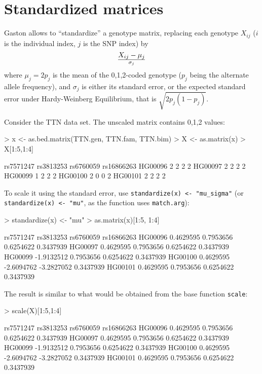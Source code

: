 \documentclass{article}
\renewenvironment{Schunk}{\vspace{\topsep}}{\vspace{\topsep}}
\begin{document}
\section{Standardized matrices}

  Gaston allows to ``standardize'' a genotype matrix, replacing each genotype $X_{ij}$ ($i$ is the
  individual index, $j$ is the SNP index) by 
\begin{equation}
X_{ij} - \mu_j \over \sigma_j
\end{equation}
  where $\mu_j = 2 p_j$ is the mean of the 0,1,2-coded genotype ($p_j$ being the alternate allele 
  frequency), and $\sigma_j$ is either its standard error, or the expected standard error under Hardy-Weinberg
  Equilibrium, that is $\sqrt{2p_j(1-p_j)}$.

  Consider the TTN data set. The unscaled matrix contains 0,1,2 values:
\begin{Schunk}
\begin{Sinput}
> x <- as.bed.matrix(TTN.gen, TTN.fam, TTN.bim)
> X <- as.matrix(x)
> X[1:5,1:4]
\end{Sinput}
\begin{Soutput}
        rs7571247 rs3813253 rs6760059 rs16866263
HG00096         2         2         2          2
HG00097         2         2         2          2
HG00099         1         2         2          2
HG00100         2         0         0          2
HG00101         2         2         2          2
\end{Soutput}
\end{Schunk}

  To scale it using the standard error, use \verb!standardize(x) <- "mu_sigma"! (or \verb!standardize(x) <- "mu"!,
  as the function uses \verb!match.arg!):
\begin{Schunk}
\begin{Sinput}
> standardize(x) <- "mu"
> as.matrix(x)[1:5, 1:4] 
\end{Sinput}
\begin{Soutput}
         rs7571247  rs3813253  rs6760059 rs16866263
HG00096  0.4629595  0.7953656  0.6254622  0.3437939
HG00097  0.4629595  0.7953656  0.6254622  0.3437939
HG00099 -1.9132512  0.7953656  0.6254622  0.3437939
HG00100  0.4629595 -2.6094762 -3.2827052  0.3437939
HG00101  0.4629595  0.7953656  0.6254622  0.3437939
\end{Soutput}
\end{Schunk}

  The result is similar to what would be obtained from the base function \verb!scale!:
\begin{Schunk}
\begin{Sinput}
> scale(X)[1:5,1:4]
\end{Sinput}
\begin{Soutput}
         rs7571247  rs3813253  rs6760059 rs16866263
HG00096  0.4629595  0.7953656  0.6254622  0.3437939
HG00097  0.4629595  0.7953656  0.6254622  0.3437939
HG00099 -1.9132512  0.7953656  0.6254622  0.3437939
HG00100  0.4629595 -2.6094762 -3.2827052  0.3437939
HG00101  0.4629595  0.7953656  0.6254622  0.3437939
\end{Soutput}
\end{Schunk}
\end{document}
